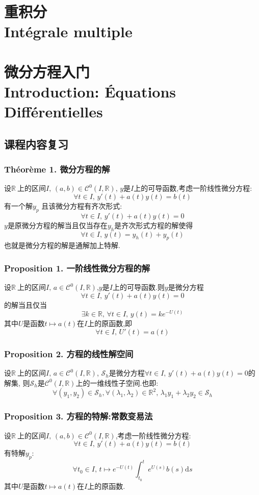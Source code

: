 \documentclass[12pt, a4paper, oneside]{ctexbook}
\newcommand{\di }{\text{d}}%
\newcommand{\R }{\mathbb{R}}%
\newcommand{\RR }{$\R\ $}%
\newcommand{\C }{\mathcal{C}}%
\begin{document}
  \chapter{重积分\\ Intégrale multiple}

  \chapter{微分方程入门\\ Introduction: Équations Différentielles}
  
  \section{课程内容复习}
  \subsection{Théorème 1. 微分方程的解}
  设\RR 上的区间$I,\,(a,b)\in\C^0(I,\R),\,y$是$I$上的可导函数,考虑一阶线性微分方程:
  $$
  \forall t\in I,\,y'(t)+a(t)y(t)=b(t)
  $$
  有一个解$y_p$
  且该微分方程有齐次形式:
  $$
  \forall t\in I,\,y'(t)+a(t)y(t)=0
  $$
  $y$是原微分方程的解当且仅当存在$y_h$是齐次形式方程的解使得
  $$
  \forall t\in I,\,y(t)=y_h(t)+y_p(t)
  $$
  也就是微分方程的解是通解加上特解.
  \subsection{Proposition 1. 一阶线性微分方程的解}
  设\RR 上的区间$I,\,a\in\C^0(I,\R)$,$y$是$I$上的可导函数.则$y$是微分方程
  $$
  \forall t\in I,\,y'(t)+a(t)y(t)=0
  $$
  的解当且仅当
  $$
  \exists k\in\R,\,\forall t\in I,\,y(t)=ke^{-U(t)}
  $$
  其中$U$是函数$t\mapsto a(t)$在$I$上的原函数,即
  $$
    \forall t\in I,\,U'(t)=a(t)
  $$
  \subsection{Proposition 2. 方程的线性解空间}
  设\RR 上的区间$I,\,a\in\C^0(I,\R)$,
  $\mathcal{S}_h$是微分方程$\forall t\in I,\,y'(t)+a(t)y(t)=0$的解集,
  则$\mathcal{S}_h$是$\C^0(I,\R)$上的一维线性子空间.也即:
  $$
  \forall(y_1,y_2)\in \mathcal{S}_h,\forall(\lambda_1,\lambda_2)\in\R^2,\,\lambda_1y_1+\lambda_2y_2\in\mathcal{S}_h
  $$
  \subsection{Proposition 3. 方程的特解:常数变易法}
  设\RR 上的区间$I,\,(a,b)\in\C^0(I,\R)$,考虑一阶线性微分方程:
  $$
  \forall t\in I,\,y'(t)+a(t)y(t)=b(t)
  $$
  有特解$y_p$:
  $$
  \forall t_0\in I,\,t\mapsto e^{-U(t)}\int_{t_0}^te^{U(s)}b(s)\di s
  $$
  其中$U$是函数$t\mapsto a(t)$在$I$上的原函数.
\end{document}
